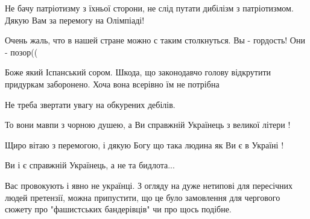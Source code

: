 \begin{itemize}
Не бачу патріотизму з їхньої сторони, не слід путати дибілізм з патріотизмом. Дякую Вам за перемогу на Олімпіаді!

 
Очень жаль, что в нашей стране можно с таким столкнуться. Вы - гордость! Они - позор((

 
Боже який Іспанський сором. Шкода, що законодавчо голову відкрутити придуркам заборонено. Хоча вона всерівно їм не потрібна

 
Не треба звертати увагу на обкурених дебілів.

То вони мавпи з чорною душею, а Ви справжній Українець з великої літери !

Щиро вітаю з перемогою, і дякую Богу що така людина як Ви є в Україні !

Ви і є справжній Українець, а не та бидлота...

 

Вас провокують і явно не українці. З огляду на дуже нетипові для пересічних
людей претензії, можна припустити, що це було замовлення для чергового сюжету
про "фашистських бандерівців" чи про щось подібне.


 


\end{itemize}
